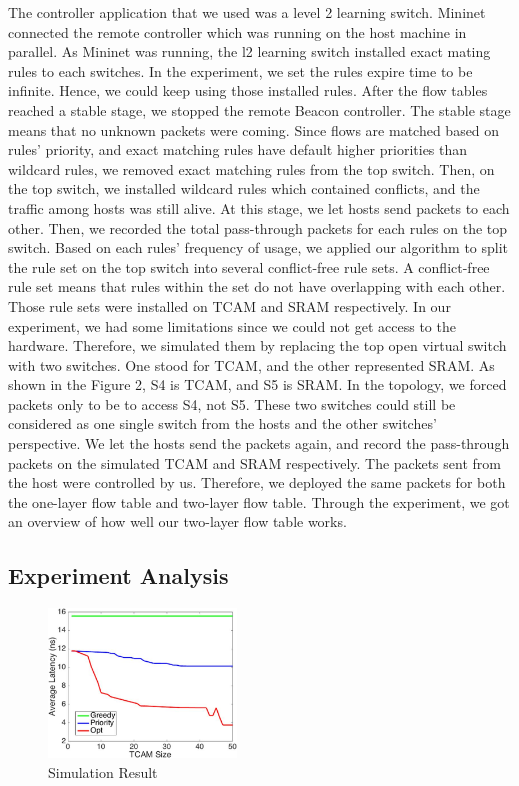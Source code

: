 \documentclass[10pt,twocolumn,letterpaper]{article}
\begin{document}
The controller application that we used was a level 2 learning switch. Mininet connected the remote controller which was running on the host machine in parallel. As Mininet was running, the l2 learning switch installed exact mating rules to each switches. In the experiment, we set the rules expire time to be infinite. Hence, we could keep using those installed rules. After the flow tables reached a stable stage, we stopped the remote Beacon controller. The stable stage means that no unknown packets were coming. Since flows are matched based on rules' priority, and exact matching rules have default higher priorities than wildcard rules, we removed exact matching rules from the top switch. Then, on the top switch, we installed wildcard rules which contained conflicts, and the traffic among hosts was still alive. At this stage, we let hosts send packets to each other. Then, we recorded the total pass-through packets for each rules on the top switch. Based on each rules’ frequency of usage, we applied our algorithm to split the rule set on the top switch into several conflict-free rule sets. A conflict-free rule set means that rules within the set do not have overlapping with each other. Those rule sets were installed on TCAM and SRAM respectively. In our experiment, we had some limitations since we could not get access to the hardware. Therefore, we simulated them by replacing the top open virtual switch with two switches. One stood for TCAM, and the other represented SRAM. As shown in the Figure 2, S4 is TCAM, and S5 is SRAM. In the topology, we forced packets only to be to access S4, not S5. These two switches could still be considered as one single switch from the hosts and the other switches' perspective. We let the hosts send the packets again, and record the pass-through packets on the simulated TCAM and SRAM respectively. The packets sent from the host were controlled by us. Therefore, we deployed the same packets for both the one-layer flow table and two-layer flow table. Through the experiment, we got an overview of how well our two-layer flow table works.

\subsection{Experiment Analysis}

\begin{figure}[ht!]
\centering
\includegraphics[width=50mm]{ExperimentResult.jpg}
\caption{Simulation Result \label{overflow}}
\end{figure}
\end{document}
